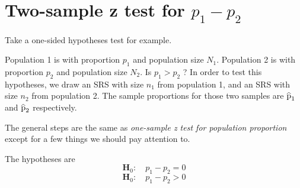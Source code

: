 \documentclass[a4paper, 12pt,twoside]{book}
\newcommand\reallywidehat[1]{%
\savestack{\tmpbox}{\stretchto{%
  \scaleto{%
    \scalerel*[\widthof{\ensuremath{#1}}]{\kern-.6pt\bigwedge\kern-.6pt}%
    {\rule[-\textheight/2]{1ex}{\textheight}}%
  }{\textheight}%
}{0.5ex}}%
\stackon[1pt]{#1}{\tmpbox}%
}
\begin{document}
\newpage
\section{Two-sample z test for $p_1-p_2$}

Take a one-sided hypotheses test for example.\vspace{0.3cm}

Population 1 is with proportion $p_1$ and population size $N_1$. Population 2 is with proportion $p_2$ and population size $N_2$. Is $p_1>p_2$ ? In order to test this hypotheses, we draw an SRS with size $n_1$ from population 1, and an SRS with size $n_2$ from population 2. The sample proportions for those two samples are $\reallywidehat{p}_1$ and $\reallywidehat{p}_2$ respectively.\vspace{0.3cm}

The general steps are the same as \textit{one-sample z test for population proportion} except for a few things we should pay attention to.\vspace{0.3cm}


The hypotheses are
$$\textbf{H}_0:\quad p_1-p_2 =0$$
$$\textbf{H}_0:\quad p_1-p_2 >0$$
\end{document}
